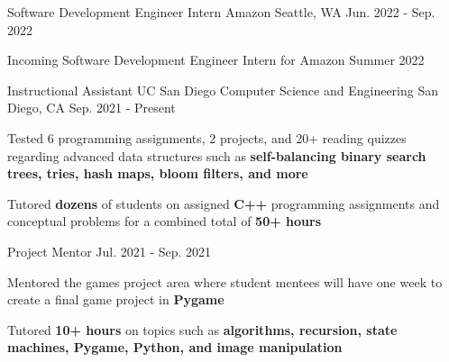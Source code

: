 

\begin{cventries}
  \cventry
    {Software Development Engineer Intern} %
    {Amazon} %
    {Seattle, WA} %
    {Jun. 2022 - Sep. 2022} %
    {
      \begin{cvitems} %
        \item {Incoming Software Development Engineer Intern for Amazon Summer 2022}
      \end{cvitems}
    }


  \cvtwoentry
    {Instructional Assistant}
    {UC San Diego Computer Science and Engineering} %
    {San Diego, CA} %
    {Sep. 2021 - Present}
    {
      \begin{cvitems}
        \item {Tested 6 programming assignments, 2 projects, and 20+ reading quizzes regarding advanced data structures such as \textbf{self-balancing binary search trees, tries, hash maps, bloom filters, and more}}
        \item {Tutored \textbf{dozens} of students on assigned \textbf{C++} programming assignments and conceptual problems for a combined total of \textbf{50+ hours}}
      \end{cvitems}
    }
    {Project Mentor} %
    {Jul. 2021 - Sep. 2021} %
    {
      \begin{cvitems} %
        \item {Mentored the games project area where student mentees will have one week to create a final game project in \textbf{Pygame}}
        \item {Tutored \textbf{10+ hours} on topics such as \textbf{algorithms, recursion, state machines, Pygame, Python, and image manipulation}}
      \end{cvitems}
    }


\end{cventries}
